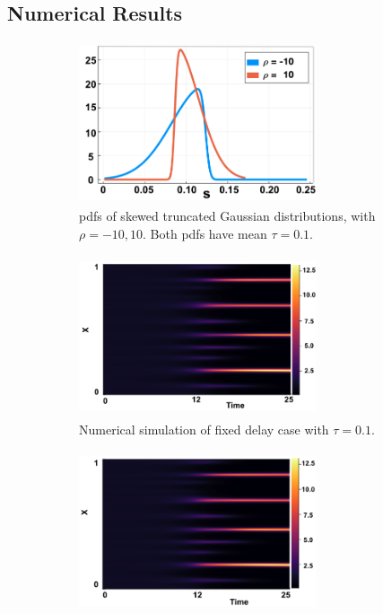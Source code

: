 \subsection{Numerical Results}\label{section:numresskew}


\begin{figure}[H]
    \centering
    \begin{subfigure}[t]{0.45\textwidth}
        \centering
        \includegraphics[width=7cm,height=4.75cm]{skewdist.png}
        \caption{pdfs of skewed truncated Gaussian distributions, with $\rho=-10,10$. Both pdfs have mean $\tau=0.1$.}
        \label{}
    \end{subfigure}
    \hfill
    \begin{subfigure}[t]{0.45\textwidth}
        \centering
        \includegraphics[width=7cm,height=4.75cm]{fixp1.png}
        \caption{Numerical simulation of fixed delay case with $\tau=0.1$.}
        \label{}
    \end{subfigure}
    \hfill
    \begin{subfigure}[t]{0.45\textwidth}
        \centering
        \includegraphics[width=7cm,height=4.75cm]{skewm10.png}

\end{subfigure}
\end{figure}
